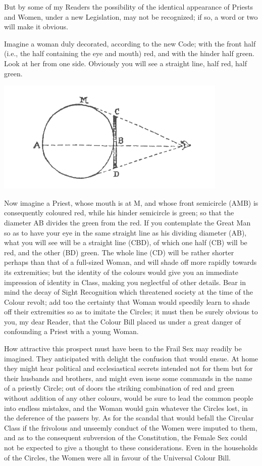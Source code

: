 \documentclass[12pt, a4paper, twoside]{memoir}
\begin{document}
But by some of my Readers the possibility of the identical appearance of
Priests and Women, under a new Legislation, may not be recognized; if so, a
word or two will make it obvious.

Imagine a woman duly decorated, according to the new Code; with the front half
(i.e., the half containing the eye and mouth) red, and with the hinder half
green. Look at her from one side. Obviously you will see a straight line, half
red, half green. 
\begin{center}
\includegraphics[trim=20mm 0mm 0mm 0mm, scale=0.5]{fig5}
\end{center}

Now imagine a Priest, whose mouth is at M, and whose front semicircle (AMB) is
consequently coloured red, while his hinder semicircle is green; so that the
diameter AB divides the green from the red. If you contemplate the Great Man
so as to have your eye in the same straight line as his dividing diameter
(AB), what you will see will be a straight line (CBD), of which one half (CB)
will be red, and the other (BD) green. The whole line (CD) will be rather
shorter perhaps than that of a full-sized Woman, and will shade off more
rapidly towards its extremities; but the identity of the colours would give
you an immediate impression of identity in Class, making you neglectful of
other details. Bear in mind the decay of Sight Recognition which threatened
society at the time of the Colour revolt; add too the certainty that Woman
would speedily learn to shade off their extremities so as to imitate the
Circles; it must then be surely obvious to you, my dear Reader, that the
Colour Bill placed us under a great danger of confounding a Priest with a
young Woman.

How attractive this prospect must have been to the Frail Sex may readily be
imagined. They anticipated with delight the confusion that would ensue. At
home they might hear political and ecclesiastical secrets intended not for
them but for their husbands and brothers, and might even issue some commands
in the name of a priestly Circle; out of doors the striking combination of red
and green without addition of any other colours, would be sure to lead the
common people into endless mistakes, and the Woman would gain whatever the
Circles lost, in the deference of the passers by. As for the scandal that
would befall the Circular Class if the frivolous and unseemly conduct of the
Women were imputed to them, and as to the consequent subversion of the
Constitution, the Female Sex could not be expected to give a thought to these
considerations. Even in the households of the Circles, the Women were all in
favour of the Universal Colour Bill.
\end{document}
